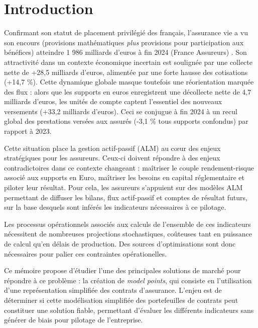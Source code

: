 \chapter*{Introduction}


Confirmant son statut de placement privilégié des français, l'assurance vie a vu son encours (provisions mathématiques \textit{plus} provisions pour participation aux bénéfices) atteindre 1 986 milliards d'euros à fin 2024 (France Assureurs) \cite{france_assureurs}. Son attractivité dans un contexte économique incertain est soulignée par une collecte nette de +28,5 milliards d'euros, alimentée par une forte hausse des cotisations (+14,7 \%). Cette dynamique globale masque toutefois une réorientation marquée des flux : alors que les supports en euros enregistrent une décollecte nette de 4,7 milliards d'euros, les unités de compte captent l'essentiel des nouveaux versements (+33,2 milliards d'euros). Ceci se conjugue à fin 2024 à un recul global des prestations versées aux assurés (-3,1 \% tous supports confondus) par rapport à 2023.

Cette situation place la gestion actif-passif (ALM) au cœur des enjeux stratégiques pour les assureurs. Ceux-ci doivent répondre à des enjeux contradictoires dans ce contexte changeant : maîtriser le couple rendement-risque associé aux supports en Euro, maîtriser les besoins en capital réglementaire et piloter leur résultat. Pour cela, les assureurs s'appuient sur des modèles ALM permettant de diffuser les bilans, flux actif-passif et comptes de résultat futurs, sur la base desquels sont inférés les indicateurs nécessaires à ce pilotage. 

Les processus opérationnels associés aux calculs de l'ensemble de ces indicateurs nécessitent de nombreuses projections stochastiques, coûteuses tant en puissance de calcul qu'en délais de production. Des sources d'optimisations sont donc nécessaires pour palier ces contraintes opérationelles. 

Ce mémoire propose d'étudier l'une des principales solutions de marché pour répondre à ce problème : la création de \textit{model points}, qui consiste en l'utilisation d'une représentation simplifiée des contrats d'assurance. L'enjeu est de déterminer si cette modélisation simplifiée des portefeuilles de contrats peut constituer une solution fiable, permettant d'évaluer les différents indicateurs sans générer de biais pour pilotage de l'entreprise.

